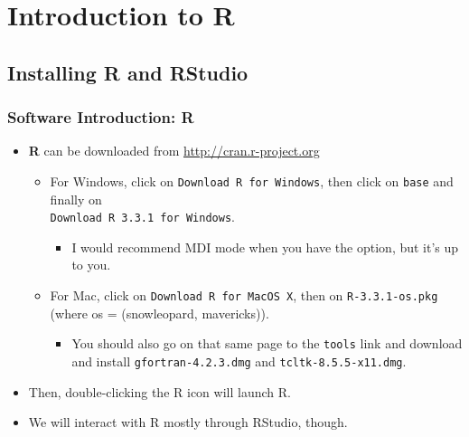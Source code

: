 \documentclass[slidestop,compress,mathserif]{beamer}\usepackage[]{graphicx}\usepackage[]{color}
\begin{document}
\section{Introduction to R}





\subsection{Installing R and RStudio}

\begin{frame}[fragile]

\frametitle{Software Introduction: R}

\begin{itemize}
	\item \textbf{R} can be downloaded from \url{http://cran.r-project.org}
	\begin{itemize}
		\item For Windows, click on \verb"Download R for Windows", then click on \verb"base" and finally on\\ \verb"Download R 3.3.1 for Windows". 
		\begin{itemize}
			\item I would recommend MDI mode when you have the option, but it's up to you. 
		\end{itemize}
		
		\item For Mac, click on \verb"Download R for MacOS X", then on \verb"R-3.3.1-os.pkg" (where os = (snowleopard, mavericks)).  
			\begin{itemize}
				\item You should also go on that same page to the \verb"tools" link and download and install \verb"gfortran-4.2.3.dmg" and \verb"tcltk-8.5.5-x11.dmg". 
			\end{itemize}
	\end{itemize}

	\item Then, double-clicking the R icon will launch R. 

	\item We will interact with R mostly through RStudio, though. 

\end{itemize}

\end{frame}
\end{document}
